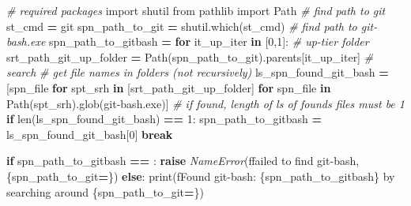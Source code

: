\documentclass[
]{book}
\newenvironment{Shaded}{\begin{snugshade}}{\end{snugshade}}
\newcommand{\BuiltInTok}[1]{#1}
\newcommand{\CommentTok}[1]{\textcolor[rgb]{0.56,0.35,0.01}{\textit{#1}}}
\newcommand{\ControlFlowTok}[1]{\textcolor[rgb]{0.13,0.29,0.53}{\textbf{#1}}}
\newcommand{\DecValTok}[1]{\textcolor[rgb]{0.00,0.00,0.81}{#1}}
\newcommand{\ImportTok}[1]{#1}
\newcommand{\KeywordTok}[1]{\textcolor[rgb]{0.13,0.29,0.53}{\textbf{#1}}}
\newcommand{\NormalTok}[1]{#1}
\newcommand{\OperatorTok}[1]{\textcolor[rgb]{0.81,0.36,0.00}{\textbf{#1}}}
\newcommand{\PreprocessorTok}[1]{\textcolor[rgb]{0.56,0.35,0.01}{\textit{#1}}}
\newcommand{\SpecialCharTok}[1]{\textcolor[rgb]{0.00,0.00,0.00}{#1}}
\newcommand{\SpecialStringTok}[1]{\textcolor[rgb]{0.31,0.60,0.02}{#1}}
\newcommand{\StringTok}[1]{\textcolor[rgb]{0.31,0.60,0.02}{#1}}
\begin{document}
\begin{Shaded}
\begin{Highlighting}[]
\CommentTok{\# required packages}
\ImportTok{import}\NormalTok{ shutil}
\ImportTok{from}\NormalTok{ pathlib }\ImportTok{import}\NormalTok{ Path}
\CommentTok{\# find path to git}
\NormalTok{st\_cmd }\OperatorTok{=} \StringTok{\textquotesingle{}git\textquotesingle{}}
\NormalTok{spn\_path\_to\_git }\OperatorTok{=}\NormalTok{ shutil.which(st\_cmd) }
\CommentTok{\# find path to git{-}bash.exe}
\NormalTok{spn\_path\_to\_gitbash }\OperatorTok{=} \StringTok{\textquotesingle{}\textquotesingle{}}
\ControlFlowTok{for}\NormalTok{ it\_up\_iter }\KeywordTok{in}\NormalTok{ [}\DecValTok{0}\NormalTok{,}\DecValTok{1}\NormalTok{]:}
    \CommentTok{\# up{-}tier folder}
\NormalTok{    srt\_path\_git\_up\_folder }\OperatorTok{=}\NormalTok{ Path(spn\_path\_to\_git).parents[it\_up\_iter]}
    \CommentTok{\# search}
    \CommentTok{\# get file names in folders (not recursively)}
\NormalTok{    ls\_spn\_found\_git\_bash }\OperatorTok{=}\NormalTok{ [spn\_file }\ControlFlowTok{for}\NormalTok{ spt\_srh }\KeywordTok{in}\NormalTok{ [srt\_path\_git\_up\_folder]}
                             \ControlFlowTok{for}\NormalTok{ spn\_file }\KeywordTok{in}\NormalTok{ Path(spt\_srh).glob(}\StringTok{\textquotesingle{}git{-}bash.exe\textquotesingle{}}\NormalTok{)]}
    \CommentTok{\# if found, length of ls of founds files must be 1}
    \ControlFlowTok{if} \BuiltInTok{len}\NormalTok{(ls\_spn\_found\_git\_bash) }\OperatorTok{==} \DecValTok{1}\NormalTok{:}
\NormalTok{        spn\_path\_to\_gitbash }\OperatorTok{=}\NormalTok{ ls\_spn\_found\_git\_bash[}\DecValTok{0}\NormalTok{]}
        \ControlFlowTok{break}
        
\ControlFlowTok{if}\NormalTok{ spn\_path\_to\_gitbash }\OperatorTok{==} \StringTok{\textquotesingle{}\textquotesingle{}}\NormalTok{:}
    \ControlFlowTok{raise} \PreprocessorTok{NameError}\NormalTok{(}\SpecialStringTok{f\textquotesingle{}failed to find git{-}bash, }\SpecialCharTok{\{}\NormalTok{spn\_path\_to\_git}\OperatorTok{=}\SpecialCharTok{\}}\SpecialStringTok{\textquotesingle{}}\NormalTok{)}
\ControlFlowTok{else}\NormalTok{:}
    \BuiltInTok{print}\NormalTok{(}\SpecialStringTok{f\textquotesingle{}Found git{-}bash: }\SpecialCharTok{\{}\NormalTok{spn\_path\_to\_gitbash}\SpecialCharTok{\}}\SpecialStringTok{ by searching around }\SpecialCharTok{\{}\NormalTok{spn\_path\_to\_git}\OperatorTok{=}\SpecialCharTok{\}}\SpecialStringTok{\textquotesingle{}}\NormalTok{)}
\end{Highlighting}
\end{Shaded}
\end{document}
